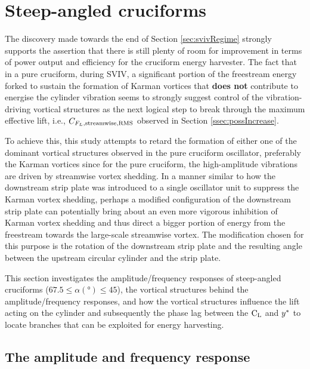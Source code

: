 \documentclass[oneside]{utmthesis}
\begin{document}
\section{Steep-angled cruciforms}\label{sec:transitionToKarman}

The discovery made towards the end of Section \ref{sec:svivRegime} strongly supports the assertion that there is still plenty of room for improvement in terms of power output and efficiency for the cruciform energy harvester. The fact that in a pure cruciform, during SVIV, a significant portion of the freestream energy forked to sustain the formation of Karman vortices that \textbf{does not} contribute to energise the cylinder vibration seems to strongly suggest control of the vibration-driving vortical structures as the next logical step to break through the maximum effective lift, i.e., $C_{F_{L},\text{streamwise},\text{RMS}}$ observed in Section \ref{ssec:possIncrease}.

To achieve this, this study attempts to retard the formation of either one of the dominant vortical structures observed in the pure cruciform oscillator, preferably the Karman vortices since for the pure cruciform, the high-amplitude vibrations are driven by streamwise vortex shedding. In a manner similar to how the downstream strip plate was introduced to a single oscillator unit to suppress the Karman vortex shedding, perhaps a modified configuration of the downstream strip plate can potentially bring about an even more vigorous inhibition of Karman vortex shedding and thus direct a bigger portion of energy from the freestream towards the large-scale streamwise vortex. The modification chosen for this purpose is the rotation of the downstream strip plate and the resulting angle between the upstream circular cylinder and the strip plate.

This section investigates the amplitude/frequency responses of steep-angled cruciforms ($67.5 \leq \alpha (\si{\degree}) \leq 45$), the vortical structures behind the amplitude/frequency responses, and how the vortical structures influence the lift acting on the cylinder and subsequently the phase lag between the $\text{C}_{\text{L}}$ and $y^{*}$ to locate branches that can be exploited for energy harvesting.

\subsection{The amplitude and frequency response}\label{ssec:transRegimeAmpFreqResp}
\end{document}
